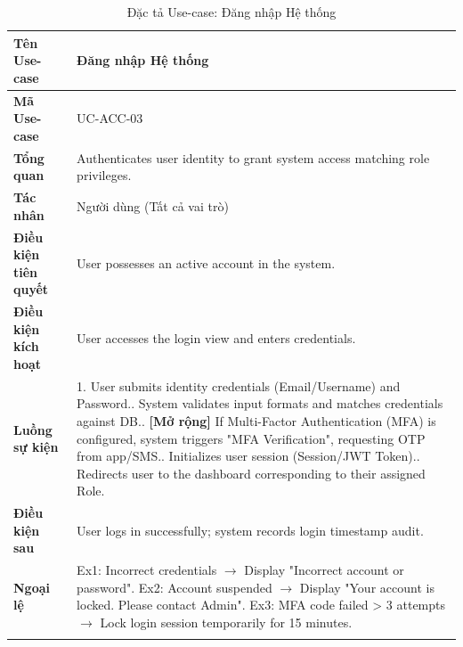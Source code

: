 \begin{longtable}{|p{3.5cm}|p{11.5cm}|}
    \hline
    \textbf{Tên Use-case} & \textbf{Đăng nhập Hệ thống} \\
    \hline
    \textbf{Mã Use-case} & UC-ACC-03 \\
    \hline
    \textbf{Tổng quan} & Authenticates user identity to grant system access matching role privileges. \\
    \hline
    \textbf{Tác nhân} & Người dùng (Tất cả vai trò) \\
    \hline
    \textbf{Điều kiện tiên quyết} & User possesses an active account in the system. \\
    \hline
    \textbf{Điều kiện kích hoạt} & User accesses the login view and enters credentials. \\
    \hline
    \textbf{Luồng sự kiện} & 
    1. User submits identity credentials (Email/Username) and Password.\newline
    2. System validates input formats and matches credentials against DB.\newline
    3. \textbf{[Mở rộng]} If Multi-Factor Authentication (MFA) is configured, system triggers "MFA Verification", requesting OTP from app/SMS.\newline
    4. Initializes user session (Session/JWT Token).\newline
    5. Redirects user to the dashboard corresponding to their assigned Role. \\
    \hline
    \textbf{Điều kiện sau} & User logs in successfully; system records login timestamp audit. \\
    \hline
    \textbf{Ngoại lệ} & 
    Ex1: Incorrect credentials $\rightarrow$ Display "Incorrect account or password".\newline
    Ex2: Account suspended $\rightarrow$ Display "Your account is locked. Please contact Admin".\newline
    Ex3: MFA code failed > 3 attempts $\rightarrow$ Lock login session temporarily for 15 minutes. \\
    \hline
    \caption{Đặc tả Use-case: Đăng nhập Hệ thống}
\end{longtable}

